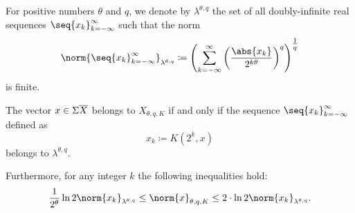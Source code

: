 \begin{definition}\label{def:discrete_k_interpolation_space}
  For positive numbers \( \theta \) and \( q \), we denote by \( \lambda^{\theta,q} \) the set of all doubly-infinite real sequences \( \seq{ x_k }_{k=-\infty}^\infty \) such that the norm
  \begin{equation}\label{eq:def:discrete_k_interpolation_space}
    \norm{\seq{ x_k }_{k=-\infty}^\infty}_{\lambda^{\theta,q}} \coloneqq \left( \sum_{k=-\infty}^\infty \left( \frac {\abs{x_k}} {2^{k\theta}} \right)^q \right)^{\tfrac 1 q}
  \end{equation}
  is finite.
\end{definition}

\begin{theorem}\label{thm:discrete_k_interpolation}
  The vector \( x \in \Sigma\oline{X} \) belongs to \hyperref[def:k_functional_interpolation_space]{\( X_{\theta,q,K} \)} if and only if the sequence \( \seq{ x_k }_{k=-\infty}^\infty \) defined as
  \begin{equation}\label{eq:thm:discrete_k_interpolation/sequence}
    x_k \coloneqq K(2^k, x)
  \end{equation}
  belongs to \hyperref[def:discrete_k_interpolation_space]{\( \lambda^{\theta,q} \)}.

  Furthermore, for any integer \( k \) the following inequalities hold:
  \begin{equation}\label{eq:thm:discrete_k_interpolation/inequalities}
    \frac 1 {2^\theta} \ln 2 \norm{x_k}_{\lambda^{\theta,q}}
    \leq
    \norm{x}_{\theta,q,K}
    \leq
    2 \cdot \ln 2 \norm{x_k}_{\lambda^{\theta,q}}.
  \end{equation}
\end{theorem}
